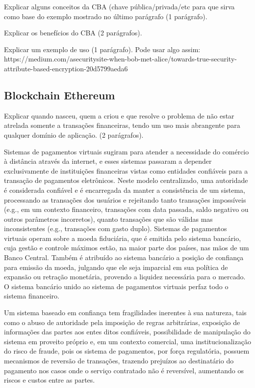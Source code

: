\documentclass[a4paper,11pt]{article}
\begin{document}
{\color{ForestGreen}Explicar alguns conceitos da CBA (chave pública/privada/etc para que sirva como base do exemplo mostrado no último parágrafo (1 parágrafo).}

{\color{ForestGreen}Explicar os benefícios do CBA (2 parágrafos).}

{\color{ForestGreen}Explicar um exemplo de uso (1 parágrafo). Pode usar algo assim: https://medium.com/asecuritysite-when-bob-met-alice/towards-true-security-attribute-based-encryption-20d5799aeda6}

\subsection{Blockchain Ethereum}

{\color{ForestGreen}Explicar quando nasceu, quem a criou e que resolve o problema de não estar atrelada somente a transações financeiras, tendo um uso mais abrangente para qualquer domínio de aplicação. (2 parágrafos).}

 Sistemas de pagamentos virtuais sugiram para atender a necessidade do comércio à distância através da internet, e esses sistemas passaram a depender exclusivamente de instituições financeiras vistas como entidades confiáveis para a transação de pagamentos eletrônicos.
 Neste modelo centralizado, uma autoridade é considerada confiável e é encarregada da manter a consistência de um sistema, processando as transações dos usuários e rejeitando tanto transações impossíveis (e.g., em um contexto financeiro, transações com data passada, saldo negativo ou outros parâmetros incorretos), quanto transações que são válidas mas inconsistentes (e.g., transações com gasto duplo).
 Sistemas de pagamentos virtuais operam sobre a moeda fiduciária, que é emitida pelo sistema bancário, cuja gestão e controle máximos estão, na maior parte dos países, nas mãos de um Banco Central. Também é atribuído ao sistema bancário a posição de confiança para emissão da moeda, julgando que ele seja imparcial em sua política de expansão ou retração monetária, provendo a liquidez necessária para o mercado. O sistema bancário unido ao sistema de pagamentos virtuais perfaz todo o sistema financeiro.

Um sistema baseado em confiança tem fragilidades inerentes à sua natureza, tais como o abuso de autoridade pela imposição de regras arbitrárias, exposição de informações das partes aos entes ditos confiáveis, possibilidade de manipulação do sistema em proveito próprio e, em um contexto comercial, uma institucionalização do risco de fraude, pois os sistema de pagamentos, por força regulatória, possuem mecanismos de reversão de transações, trazendo prejuízos ao destinatário do pagamento nos casos onde o serviço contratado não é reversível, aumentando os riscos e custos entre as partes.
\end{document}

